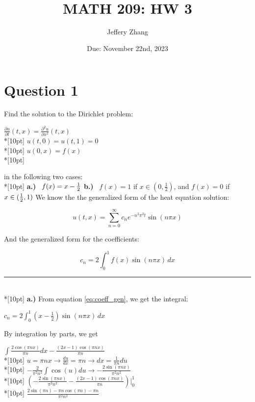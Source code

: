 \documentclass{article}
\title{\textbf{MATH 209: HW 3}}
\author{Jeffery Zhang}
\date{Due: November 22nd, 2023}
\begin{document}
\maketitle

\section{Question 1}
Find the solution to the Dirichlet problem: 
\begin{center}
    \(\displaystyle \frac{\partial u}{\partial t}(t, x) = \frac{\partial^2u}{\partial x^2}(t, x)\)\\*[10pt]
    \(u(t, 0) = u(t, 1) = 0\)\\*[10pt]
    \(u(0, x) = f(x)\)\\*[10pt]
\end{center}
in the following two cases:\\*[10pt]
\textbf{a.)} \ \(f(x) = x - \frac{1}{2}\\*[10pt]\)
\textbf{b.)} \ \(f(x) = 1\) if \(x \in (0, \frac{1}{2})\), and \(f(x) = 0\) if \(x \in (\frac{1}{2}, 1)\\*[10pt]\)
We know the the generalized form of the heat equation solution:
\begin{center}
    \begin{equation}\label{eq:heat_gen}
        \displaystyle u(t, x) = \sum_{n=0}^{\infty} c_ne^{-n^2\pi^2t}\sin(n\pi x)
    \end{equation}
\end{center}
And the generalized form for the coefficients:
\begin{center}
    \begin{equation}\label{eq:coeff_gen}
        \displaystyle c_n = 2\int_{0}^{1} f(x)\sin(n\pi x) \, dx
    \end{equation}
\end{center}
\rule{\linewidth}{0.2mm}\\*[10pt]
\textbf{a.)} From equation \eqref{eq:coeff_gen}, we get the integral:
\begin{center}
    \(\displaystyle c_n = 2\int_{0}^{1} (x - \frac{1}{2})\sin(n\pi x) \, dx\)
\end{center}
\clearpage \noindent
By integration by parts, we get
\begin{center}
    \(\displaystyle\int\frac{2\cos(\pi nx)}{\pi n}dx-\frac{(2x - 1)\cos(\pi nx)}{\pi n}\)\\*[10pt]
    \(\displaystyle u = \pi nx \rightarrow \frac{du}{dx} = \pi n \rightarrow dx = \frac{1}{\pi n}du\)\\*[10pt]
    \(\displaystyle -\frac{2}{\pi^2n^2}\int\cos(u)du \rightarrow -\frac{2\sin(\pi nx)}{\pi^2n^2}\)\\*[10pt]
    \(\displaystyle (-\frac{2\sin(\pi nx)}{\pi^2n^2}-\frac{(2x - 1)\cos(\pi nx)}{\pi n})\Bigg|_{0}^{1}\)\\*[10pt]
    \(\displaystyle \frac{2\sin(\pi n) - \pi n\cos(\pi n)-\pi n}{\pi^2n^2}\)
\end{center}
\end{document}
